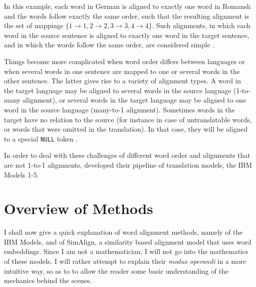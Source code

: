In this example, each word in German is aligned to exactly one word in Romansh and the words follow exactly the same order, such that the resulting alignment is the set of mappings $\{1\to1, 2\to2,3\to3,4\to4\}$. 
Such alignments, in which each word in the source sentence is aligned to exactly one word in the target sentence, and in which the words follow the same order, are considered simple \autocite[85]{koehn2009}.

Things become more complicated when word order differs between languages or when several words in one sentence are mapped to one or several words in the other sentence. 
The latter gives rise to a variety of alignment types. 
A word in the target language may be aligned to several words in the source language (1-to-many alignment), or several words in the target language may be aligned to one word in the source language (many-to-1 alignment). 
Sometimes words in the target have no relation to the source (for instance in case of untranslatable words, or words that were omitted in the translation). 
In that case, they will be aligned to a special \texttt{NULL} token \autocite[85]{koehn2009}. 


In order to deal with these challenges of different word order and alignments that are not 1-to-1 alignments, \cite{brown-etal-1993-mathematics} developed their pipeline of translation models, the IBM Models 1-5.

\section{Overview of Methods}
I shall now give a quick explanation of word alignment methods, namely of the IBM Models, and of SimAlign, a similarity based alignment model that uses  word embeddings. 
Since I am not a mathematician, I will not go into the mathematics of these models. 
I will rather attempt to explain their \emph{modus operandi} in a more intuitive way, so as to to allow the reader some basic understanding of the mechanics behind the scenes.

